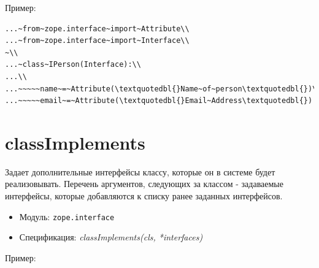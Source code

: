 \documentclass[a4paper,openany,twoside,draft]{book}
\providecommand*{\DUroletitlereference}[1]{\textsl{#1}}
\begin{document}
Пример:

\begin{verbatim}
...~from~zope.interface~import~Attribute\\
...~from~zope.interface~import~Interface\\
~\\
...~class~IPerson(Interface):\\
...\\
...~~~~~name~=~Attribute(\textquotedbl{}Name~of~person\textquotedbl{})\\
...~~~~~email~=~Attribute(\textquotedbl{}Email~Address\textquotedbl{})
\end{verbatim}


\section*{classImplements%
  \label{classimplements}%
}

Задает дополнительные интерфейсы классу, которые он в системе будет
реализовывать.  Перечень аргументов, следующих за классом -
задаваемые интерфейсы, которые добавляются к списку ранее
заданных интерфейсов.

\begin{itemize}

\item Модуль: \texttt{zope.interface}

\item Спецификация: \DUroletitlereference{classImplements(cls, *interfaces)}

\end{itemize}

Пример:
\end{document}
